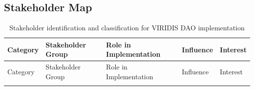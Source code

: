 \documentclass[
  english,
  12pt,
  oneside,
  open=any]{scrbook}
\begin{document}
\subsection{Stakeholder Map}\label{stakeholder-map}

\begin{longtable}[]{@{}
  >{\raggedright\arraybackslash}p{}
  >{\raggedright\arraybackslash}p{}
  >{\raggedright\arraybackslash}p{}
  >{\raggedright\arraybackslash}p{}
  >{\raggedright\arraybackslash}p{}@{}}
\caption{Stakeholder identification and classification for VIRIDIS DAO
implementation}\label{tbl-stakeholders}\tabularnewline
\toprule\noalign{}
\begin{minipage}[b]{\linewidth}\raggedright
Category
\end{minipage} & \begin{minipage}[b]{\linewidth}\raggedright
Stakeholder Group
\end{minipage} & \begin{minipage}[b]{\linewidth}\raggedright
Role in Implementation
\end{minipage} & \begin{minipage}[b]{\linewidth}\raggedright
Influence
\end{minipage} & \begin{minipage}[b]{\linewidth}\raggedright
Interest
\end{minipage} \\
\midrule\noalign{}
\endfirsthead
\toprule\noalign{}
\begin{minipage}[b]{\linewidth}\raggedright
Category
\end{minipage} & \begin{minipage}[b]{\linewidth}\raggedright
Stakeholder Group
\end{minipage} & \begin{minipage}[b]{\linewidth}\raggedright
Role in Implementation
\end{minipage} & \begin{minipage}[b]{\linewidth}\raggedright
Influence
\end{minipage} & \begin{minipage}[b]{\linewidth}\raggedright
Interest
\end{minipage} \\
\midrule\noalign{}
\endhead
\bottomrule\noalign{}
\endlastfoot

\end{longtable}
\end{document}
